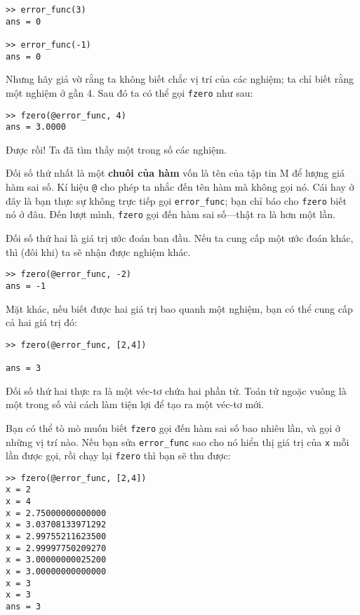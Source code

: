 \documentclass[12pt]{book}
\begin{document}
\begin{verbatim}
>> error_func(3)
ans = 0

>> error_func(-1)
ans = 0
\end{verbatim}

Nhưng hãy giả vờ rằng ta không biết chắc vị trí của các nghiệm;
ta chỉ biết rằng một nghiệm ở gần 4.  Sau đó ta có thể gọi 
{\tt fzero} như sau:

\begin{verbatim}
>> fzero(@error_func, 4)
ans = 3.0000
\end{verbatim}

Được rồi! Ta đã tìm thấy một trong số các nghiệm.

Đối số thứ nhất là một {\bf chuôi của hàm} vốn là tên của 
tập tin M để lượng giá hàm sai số. Kí hiệu  {\tt @} cho phép
ta nhắc đến tên hàm mà không gọi nó. Cái hay ở đây là bạn
thực sự không trực tiếp gọi \verb#error_func#; bạn chỉ
báo cho {\tt fzero} biết nó ở đâu.  Đến lượt mình, {\tt fzero}
gọi đến hàm sai số---thật ra là hơn một lần.

Đối số thứ hai là giá trị ước đoán ban đầu. Nếu ta cung cấp 
một ước đoán khác, thì (đôi khi) ta sẽ nhận được nghiệm khác.

\begin{verbatim}
>> fzero(@error_func, -2)
ans = -1
\end{verbatim}

Mặt khác, nếu biết được hai giá trị bao quanh một nghiệm,
bạn có thể cung cấp cả hai giá trị đó:

\begin{verbatim}
>> fzero(@error_func, [2,4])

ans = 3
\end{verbatim}

Đối số thứ hai thực ra là một véc-tơ chứa hai phần tử. Toán tử
ngoặc vuông là một trong số vài cách làm tiện lợi để tạo ra 
một véc-tơ mới.

Bạn có thể tò mò muốn biết {\tt fzero} gọi đến hàm sai số bao nhiêu
lần, và gọi ở những vị trí nào. Nếu bạn sửa \verb#error_func# 
sao cho nó hiển thị giá trị của {\tt x} mỗi lần được gọi, rồi chạy lại 
{\tt fzero} thì bạn sẽ thu được:

\begin{verbatim}
>> fzero(@error_func, [2,4])
x = 2
x = 4
x = 2.75000000000000
x = 3.03708133971292
x = 2.99755211623500
x = 2.99997750209270
x = 3.00000000025200
x = 3.00000000000000
x = 3
x = 3
ans = 3
\end{verbatim}
\end{document}
